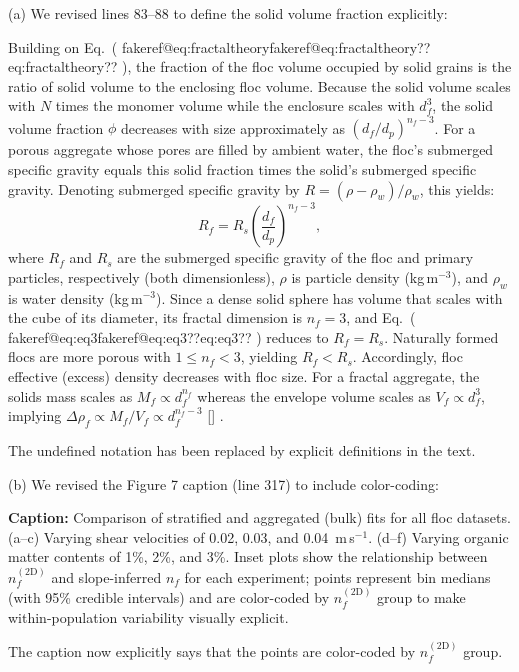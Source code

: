 \documentclass[11pt]{article}
\makeatletter
\newenvironment{Snippet}{%
  \par\vspace{0.3em}\begin{list}{}{\setlength{\leftmargin}{1em}\setlength{\rightmargin}{0.5em}}\item\small\itshape
}{%
  \end{list}\vspace{0.3em}
}
\newcommand{\fakeref}[1]{%
  \ifcsname fakeref@#1\endcsname\csname fakeref@#1\endcsname\else ??#1??\fi
}
\renewcommand{\eqref}[1]{(\fakeref{#1})}%
\newcommand{\citelookup}[1]{%
  \ifcsname cite@#1\endcsname\csname cite@#1\endcsname\else #1\fi
}
\newcommand{\citeformat}[1]{%
  \def\citelist{}%
  \forcsvlist{\addtocitelist}{#1}%
  \textup{[\citelist]}%
}
\newcommand{\addtocitelist}[1]{%
  \ifx\citelist\empty
    \edef\citelist{\citelookup{#1}}%
  \else
    \edef\citelist{\citelist;\space\citelookup{#1}}%
  \fi
}
\renewcommand{\cite}[1]{\citeformat{#1}}
\renewcommand{\label}[1]{}%
\renewcommand{\caption}[2][]{\par\noindent\textbf{Caption:} #2\par}
\makeatother
\begin{document}
\begin{enumerate}[label=\textbf{R3.\arabic*.}]
(a) We revised lines 83--88 to define the solid volume fraction explicitly:
\begin{Snippet}
Building on Eq.~\eqref{eq:fractaltheory}, the fraction of the floc volume occupied by solid grains is the ratio of solid volume to the enclosing floc volume. Because the solid volume scales with $N$ times the monomer volume while the enclosure scales with $d_f^{3}$, the solid volume fraction $\phi$ decreases with size approximately as $(d_f/d_p)^{n_f-3}$. For a porous aggregate whose pores are filled by ambient water, the floc's submerged specific gravity equals this solid fraction times the solid's submerged specific gravity. Denoting submerged specific gravity by $R = (\rho - \rho_w)/\rho_w$, this yields:
\begin{equation}
R_f = R_s \left( \frac{d_f}{d_p} \right)^{n_f-3},
\label{eq:eq3}
\end{equation}
where $R_f$ and $R_s$ are the submerged specific gravity of the floc and primary particles, respectively (both dimensionless), $\rho$ is particle density (kg\,m$^{-3}$), and $\rho_w$ is water density (kg\,m$^{-3}$). Since a dense solid sphere has volume that scales with the cube of its diameter, its fractal dimension is $n_f = 3$, and Eq.~\eqref{eq:eq3} reduces to $R_f = R_s$. Naturally formed flocs are more porous with $1 \le n_f < 3$, yielding $R_f < R_s$. Accordingly, floc effective (excess) density decreases with floc size. For a fractal aggregate, the solids mass scales as $M_f \propto d_f^{n_f}$ whereas the envelope volume scales as $V_f \propto d_f^{3}$, implying $\Delta \rho_f \propto M_f / V_f \propto d_f^{n_f-3}$ \cite{kranenburg1994fractal}.
\end{Snippet}
The undefined notation has been replaced by explicit definitions in the text.

(b) We revised the Figure 7 caption (line 317) to include color-coding:
\begin{Snippet}
    \caption{Comparison of stratified and aggregated (bulk) fits for all floc datasets. (a--c) Varying shear velocities of 0.02, 0.03, and 0.04~m\,s$^{-1}$. (d--f) Varying organic matter contents of 1\%, 2\%, and 3\%. Inset plots show the relationship between \(n_f^{(\mathrm{2D})}\) and slope-inferred \(n_f\) for each experiment; points represent bin medians (with 95\% credible intervals) and are color-coded by \(n_f^{(\mathrm{2D})}\) group to make within-population variability visually explicit.}
\end{Snippet}
The caption now explicitly says that the points are color-coded by $n_f^{(\mathrm{2D})}$ group.


\end{enumerate}
\end{document}
